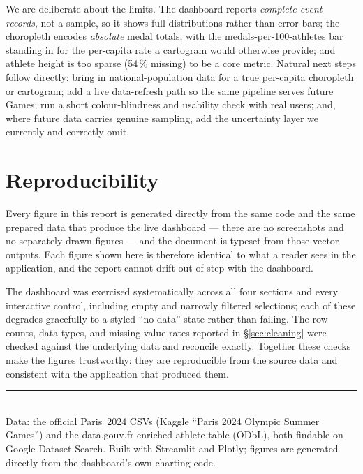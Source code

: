 \documentclass[11pt]{article}
\begin{document}
We are deliberate about the limits. The dashboard reports \emph{complete event
records}, not a sample, so it shows full distributions rather than error bars; the
choropleth encodes \emph{absolute} medal totals, with the medals-per-100-athletes
bar standing in for the per-capita rate a cartogram would otherwise provide; and
athlete height is too sparse (54\,\% missing) to be a core metric. Natural next
steps follow directly: bring in national-population data for a true per-capita
choropleth or cartogram; add a live data-refresh path so the same pipeline serves
future Games; run a short colour-blindness and usability check with real users;
and, where future data carries genuine sampling, add the uncertainty layer we
currently and correctly omit.

\section{Reproducibility}
\label{sec:repro}

Every figure in this report is generated directly from the same code and the same
prepared data that produce the live dashboard --- there are no screenshots and no
separately drawn figures --- and the document is typeset from those vector outputs.
Each figure shown here is therefore identical to what a reader sees in the
application, and the report cannot drift out of step with the dashboard.

The dashboard was exercised systematically across all four sections and every
interactive control, including empty and narrowly filtered selections; each of
these degrades gracefully to a styled ``no data'' state rather than failing. The
row counts, data types, and missing-value rates reported in \S\ref{sec:cleaning}
were checked against the underlying data and reconcile exactly. Together these
checks make the figures trustworthy: they are reproducible from the source data
and consistent with the application that produced them.

\vspace{0.6cm}
\noindent\rule{\linewidth}{0.4pt}\\[2pt]
{\footnotesize\sffamily\color{slate}
Data: the official Paris~2024 CSVs (Kaggle ``Paris 2024 Olympic Summer Games'')
and the data.gouv.fr enriched athlete table (ODbL), both findable on Google
Dataset Search. Built with Streamlit and Plotly; figures are generated directly
from the dashboard's own charting code.}
\end{document}
